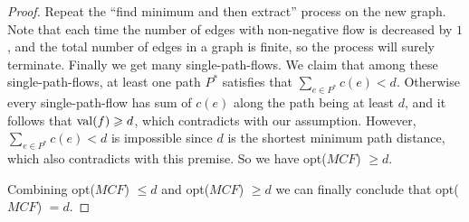 \begin{proof}
        Repeat the ``find minimum and then extract'' process on the new graph. Note that each time the number of edges with non-negative flow is decreased by $1$, and the total number of edges in a graph is finite, so the process will surely terminate. Finally we get many single-path-flows. We claim that among these single-path-flows, at least one path $P^*$ satisfies that $\sum_{e \in P^*} c(e) < d$. Otherwise every single-path-flow has sum of $c(e)$ along the path being at least $d$, and it follows that ${\rm val}(f) \geqslant d$, which contradicts with our assumption. However, $\sum_{e \in P^*} c(e) < d$ is impossible since $d$ is the shortest minimum path distance, which also contradicts with this premise. So we have opt($MCF$) $\geqslant d$.
        
        \bigskip
        
        Combining opt($MCF$) $\leqslant d$ and opt($MCF$) $\geqslant d$ we can finally conclude that opt($MCF$) $= d$.
    \end{proof}




